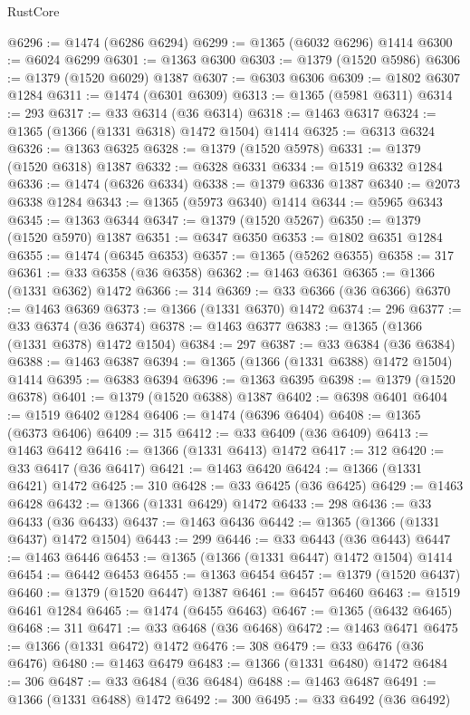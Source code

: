 \begin{lexlean}{RustCore}
\begin{coremodule}
@6296 := @1474 (@6286 @6294)
@6299 := @1365 (@6032 @6296) @1414
@6300 := @6024 @6299
@6301 := @1363 @6300
@6303 := @1379 (@1520 @5986)
@6306 := @1379 (@1520 @6029) @1387
@6307 := @6303 @6306
@6309 := @1802 @6307 @1284
@6311 := @1474 (@6301 @6309)
@6313 := @1365 (@5981 @6311)
@6314 := 293
@6317 := @33 @6314 (@36 @6314)
@6318 := @1463 @6317
@6324 := @1365 (@1366 (@1331 @6318) @1472 @1504) @1414
@6325 := @6313 @6324
@6326 := @1363 @6325
@6328 := @1379 (@1520 @5978)
@6331 := @1379 (@1520 @6318) @1387
@6332 := @6328 @6331
@6334 := @1519 @6332 @1284
@6336 := @1474 (@6326 @6334)
@6338 := @1379 @6336 @1387
@6340 := @2073 @6338 @1284
@6343 := @1365 (@5973 @6340) @1414
@6344 := @5965 @6343
@6345 := @1363 @6344
@6347 := @1379 (@1520 @5267)
@6350 := @1379 (@1520 @5970) @1387
@6351 := @6347 @6350
@6353 := @1802 @6351 @1284
@6355 := @1474 (@6345 @6353)
@6357 := @1365 (@5262 @6355)
@6358 := 317
@6361 := @33 @6358 (@36 @6358)
@6362 := @1463 @6361
@6365 := @1366 (@1331 @6362) @1472
@6366 := 314
@6369 := @33 @6366 (@36 @6366)
@6370 := @1463 @6369
@6373 := @1366 (@1331 @6370) @1472
@6374 := 296
@6377 := @33 @6374 (@36 @6374)
@6378 := @1463 @6377
@6383 := @1365 (@1366 (@1331 @6378) @1472 @1504)
@6384 := 297
@6387 := @33 @6384 (@36 @6384)
@6388 := @1463 @6387
@6394 := @1365 (@1366 (@1331 @6388) @1472 @1504) @1414
@6395 := @6383 @6394
@6396 := @1363 @6395
@6398 := @1379 (@1520 @6378)
@6401 := @1379 (@1520 @6388) @1387
@6402 := @6398 @6401
@6404 := @1519 @6402 @1284
@6406 := @1474 (@6396 @6404)
@6408 := @1365 (@6373 @6406)
@6409 := 315
@6412 := @33 @6409 (@36 @6409)
@6413 := @1463 @6412
@6416 := @1366 (@1331 @6413) @1472
@6417 := 312
@6420 := @33 @6417 (@36 @6417)
@6421 := @1463 @6420
@6424 := @1366 (@1331 @6421) @1472
@6425 := 310
@6428 := @33 @6425 (@36 @6425)
@6429 := @1463 @6428
@6432 := @1366 (@1331 @6429) @1472
@6433 := 298
@6436 := @33 @6433 (@36 @6433)
@6437 := @1463 @6436
@6442 := @1365 (@1366 (@1331 @6437) @1472 @1504)
@6443 := 299
@6446 := @33 @6443 (@36 @6443)
@6447 := @1463 @6446
@6453 := @1365 (@1366 (@1331 @6447) @1472 @1504) @1414
@6454 := @6442 @6453
@6455 := @1363 @6454
@6457 := @1379 (@1520 @6437)
@6460 := @1379 (@1520 @6447) @1387
@6461 := @6457 @6460
@6463 := @1519 @6461 @1284
@6465 := @1474 (@6455 @6463)
@6467 := @1365 (@6432 @6465)
@6468 := 311
@6471 := @33 @6468 (@36 @6468)
@6472 := @1463 @6471
@6475 := @1366 (@1331 @6472) @1472
@6476 := 308
@6479 := @33 @6476 (@36 @6476)
@6480 := @1463 @6479
@6483 := @1366 (@1331 @6480) @1472
@6484 := 306
@6487 := @33 @6484 (@36 @6484)
@6488 := @1463 @6487
@6491 := @1366 (@1331 @6488) @1472
@6492 := 300
@6495 := @33 @6492 (@36 @6492)

\end{coremodule}
\end{lexlean}
